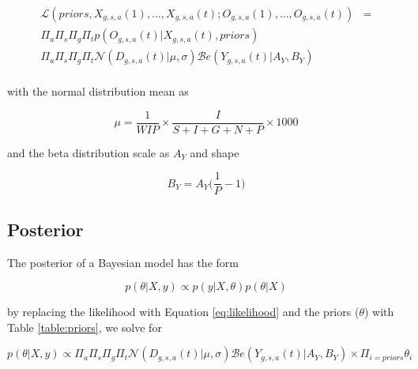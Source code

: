 \documentclass[12pt]{article}
\begin{document}
\begin{align}
\mathcal{L}(priors, X_{g,s,a}(1), \dots, X_{g,s,a}(t); O_{g,s,a}(1), \dots, O_{g,s,a}(t)) &= \\ 
\Pi_{a}\Pi_{s}\Pi_{g}\Pi_{t}p(O_{g,s,a}(t) | X_{g,s,a}(t), priors) & \\
\Pi_{a}\Pi_{s}\Pi_{g}\Pi_{t}\mathcal{N}(D_{g,s,a}(t)| \mu, \sigma)\mathcal{B}e(Y_{g,s,a}(t)|A_{Y}, B_{Y}) & \\
\label{eq:likelihood}
\end{align}

with the normal distribution mean as

\begin{equation}
\mu = \frac{1}{WIP}\times \frac{I}{S + I + G + N + P}\times 1000
\end{equation}

and the beta distribution scale as $A_{Y}$ and shape 

\begin{equation}
B_{Y} = A_{Y}\bigg( \frac{1}{P} - 1 \bigg)
\end{equation}

\subsection{Posterior}

The posterior of a Bayesian model has the form

\begin{equation}
p(\theta|X, y) \propto p(y|X,\theta)p(\theta|X)
\end{equation}

by replacing the likelihood with Equation \ref{eq:likelihood} and the priors ($\theta$) with Table \ref{table:priors}, we solve for

\begin{equation}
p(\theta|X, y) \propto \Pi_{a}\Pi_{s}\Pi_{g}\Pi_{t}\mathcal{N}(D_{g,s,a}(t)| \mu, \sigma)\mathcal{B}e(Y_{g,s,a}(t)|A_{Y}, B_{Y}) \times \Pi_{i=priors}\theta_{i}
\end{equation}



\end{document}
